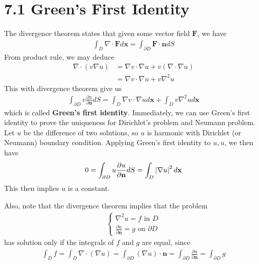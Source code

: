 \documentclass{report}
\begin{document}
\section{7.1 Green's First Identity}
\begin{mdframed}
The divergence theorem states that given some vector field $\textbf{F}$, we have 
\begin{align*}
\int_D \nabla \cdot \textbf{F} d\textbf{x}= \int_{\partial  D} \textbf{F} \cdot \textbf{n}dS 
\end{align*}
From product rule, we may deduce 
\begin{align*}
\nabla \cdot (v \nabla u )&= \nabla v \cdot \nabla u + v (\nabla \cdot \nabla u) \\
&=\nabla v \cdot \nabla u+ v \nabla^2 u
\end{align*}
This with divergence theorem give us 
\begin{align*}
\int_{\partial D} v \frac{\partial u}{\partial \textbf{n}}dS = \int_D \nabla v \cdot \nabla u d\textbf{x}+ \int_D v \nabla^2 u d\textbf{x}
\end{align*}
which is called \textbf{Green's first identity}. Immediately, we can use Green's first identity to prove the uniqueness for Dirichlet's problem and Neumann problem. Let $u$ be the difference of two solutions, so  $u$ is harmonic with Dirichlet (or Neumann) boundary condition. Applying Green's first identity to $u,u$, we then have 
\begin{align*}
0=\int_{\partial  D} u \frac{\partial u}{\partial \textbf{n}}dS= \int_D \left|\nabla u\right|^2 d\textbf{x}
\end{align*}
This then implies $u$ is a constant. 
\end{mdframed}
\begin{mdframed}
Also, note that the divergence theorem implies that the problem 
\begin{align*}
\begin{cases}
  \nabla^2 u = f\text{ in }D \\
  \frac{\partial u}{\partial \textbf{n}}=g\text{ on }\partial D
\end{cases}
\end{align*}
has solution only if the integrals of $f$ and  $g$ are equal, since 
 \begin{align*}
\int_D f= \int_D \nabla \cdot (\nabla u )= \int_{\partial D} (\nabla u) \cdot \textbf{n} = \int_{\partial D} \frac{\partial u}{\partial \textbf{n}}= \int_{\partial D} g
\end{align*}

\end{mdframed}
\end{document}
